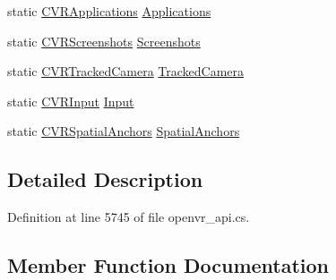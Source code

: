\begin{DoxyCompactItemize}
\item 
static \mbox{\hyperlink{class_valve_1_1_v_r_1_1_c_v_r_applications}{C\+V\+R\+Applications}} \mbox{\hyperlink{class_valve_1_1_v_r_1_1_open_v_r_affb13ebb2d1cfcb5a0a7204ca5cd78e5}{Applications}}
\item 
static \mbox{\hyperlink{class_valve_1_1_v_r_1_1_c_v_r_screenshots}{C\+V\+R\+Screenshots}} \mbox{\hyperlink{class_valve_1_1_v_r_1_1_open_v_r_aba4df8c153a4f1ac4b8016672df826aa}{Screenshots}}
\item 
static \mbox{\hyperlink{class_valve_1_1_v_r_1_1_c_v_r_tracked_camera}{C\+V\+R\+Tracked\+Camera}} \mbox{\hyperlink{class_valve_1_1_v_r_1_1_open_v_r_a5ea08ced399257a11cd8ebc9efebfa1f}{Tracked\+Camera}}
\item 
static \mbox{\hyperlink{class_valve_1_1_v_r_1_1_c_v_r_input}{C\+V\+R\+Input}} \mbox{\hyperlink{class_valve_1_1_v_r_1_1_open_v_r_a7654f626318585e535bbcdca6a2b01ec}{Input}}
\item 
static \mbox{\hyperlink{class_valve_1_1_v_r_1_1_c_v_r_spatial_anchors}{C\+V\+R\+Spatial\+Anchors}} \mbox{\hyperlink{class_valve_1_1_v_r_1_1_open_v_r_aa0a20f8a24534d4d134f1e86ab9ac1ec}{Spatial\+Anchors}}
\end{DoxyCompactItemize}


\subsection{Detailed Description}


Definition at line 5745 of file openvr\+\_\+api.\+cs.



\subsection{Member Function Documentation}
\mbox{\label{class_valve_1_1_v_r_1_1_open_v_r_a72b1be1a267229f304e1f8fb9b8c38a6}} 
